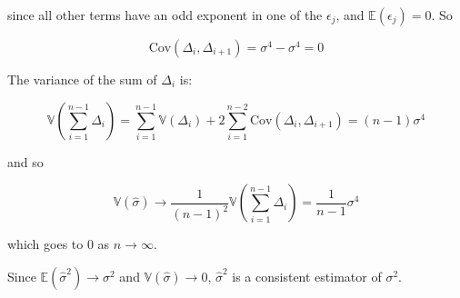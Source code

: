 since all other terms have an odd exponent in one of the \(\epsilon_j\),
and \(\mathbb{E}(\epsilon_j) = 0\). So

\[ \text{Cov}(\Delta_i, \Delta_{i+1}) = \sigma^4 - \sigma^4 = 0\]

The variance of the sum of \(\Delta_i\) is:

\[ \mathbb{V}\left( \sum_{i=1}^{n-1} \Delta_i \right) = \sum_{i=1}^{n-1} \mathbb{V}(\Delta_i) + 2 \sum_{i=1}^{n-2} \text{Cov}(\Delta_i, \Delta_{i+1}) = (n-1) \sigma^4\]

and so

\[ \mathbb{V}(\hat{\sigma}) \rightarrow \frac{1}{(n-1)^2} \mathbb{V}\left( \sum_{i=1}^{n-1} \Delta_i \right) = \frac{1}{n-1} \sigma^4 \]

which goes to 0 as \(n \rightarrow \infty\).

Since \(\mathbb{E}(\hat{\sigma}^2) \rightarrow \sigma^2\) and
\(\mathbb{V}(\hat{\sigma}) \rightarrow 0\), \(\hat{\sigma}^2\) is a
consistent estimator of \(\sigma^2\).
